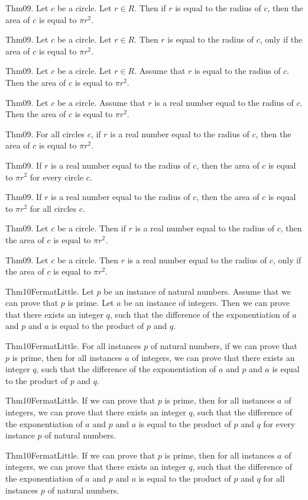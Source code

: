 \documentclass{article}
\begin{document}
Thm09. Let $c$ be a circle. Let $r \in R$. Then if $r$ is equal to the radius of $c$, then the area of $c$ is equal to $\pi r ^ {2}$.

Thm09. Let $c$ be a circle. Let $r \in R$. Then $r$ is equal to the radius of $c$, only if the area of $c$ is equal to $\pi r ^ {2}$.

Thm09. Let $c$ be a circle. Let $r \in R$. Assume that $r$ is equal to the radius of $c$. Then the area of $c$ is equal to $\pi r ^ {2}$.

Thm09. Let $c$ be a circle. Assume that $r$ is a real number equal to the radius of $c$. Then the area of $c$ is equal to $\pi r ^ {2}$.

Thm09. For all circles $c$, if $r$ is a real number equal to the radius of $c$, then the area of $c$ is equal to $\pi r ^ {2}$.

Thm09. If $r$ is a real number equal to the radius of $c$, then the area of $c$ is equal to $\pi r ^ {2}$ for every circle $c$.

Thm09. If $r$ is a real number equal to the radius of $c$, then the area of $c$ is equal to $\pi r ^ {2}$ for all circles $c$.

Thm09. Let $c$ be a circle. Then if $r$ is a real number equal to the radius of $c$, then the area of $c$ is equal to $\pi r ^ {2}$.

Thm09. Let $c$ be a circle. Then $r$ is a real number equal to the radius of $c$, only if the area of $c$ is equal to $\pi r ^ {2}$.

Thm10FermatLittle. Let $p$ be an instance of natural numbers. Assume that we can prove that $p$ is prime. Let $a$ be an instance of integers. Then we can prove that there exists an integer $q$, such that the difference of the exponentiation of $a$ and $p$ and $a$ is equal to the product of $p$ and $q$.

Thm10FermatLittle. For all instances $p$ of natural numbers, if we can prove that $p$ is prime, then for all instances $a$ of integers, we can prove that there exists an integer $q$, such that the difference of the exponentiation of $a$ and $p$ and $a$ is equal to the product of $p$ and $q$.

Thm10FermatLittle. If we can prove that $p$ is prime, then for all instances $a$ of integers, we can prove that there exists an integer $q$, such that the difference of the exponentiation of $a$ and $p$ and $a$ is equal to the product of $p$ and $q$ for every instance $p$ of natural numbers.

Thm10FermatLittle. If we can prove that $p$ is prime, then for all instances $a$ of integers, we can prove that there exists an integer $q$, such that the difference of the exponentiation of $a$ and $p$ and $a$ is equal to the product of $p$ and $q$ for all instances $p$ of natural numbers.
\end{document}
